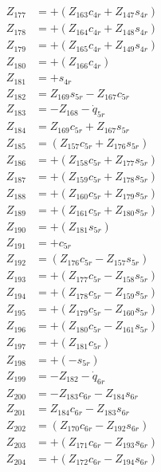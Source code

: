 \begin{multicols}{2}
\begin{align}
Z_{177} &= + (Z_{163}c_{4r} + Z_{147}s_{4r}) \nonumber \\
Z_{178} &= + (Z_{164}c_{4r} + Z_{148}s_{4r}) \nonumber \\
Z_{179} &= + (Z_{165}c_{4r} + Z_{149}s_{4r}) \nonumber \\
Z_{180} &= + (Z_{166}c_{4r}) \nonumber \\ 
Z_{181} &= + s_{4r} \nonumber \\
Z_{182} &=  Z_{169}s_{5r} - Z_{167}c_{5r} \nonumber \\
Z_{183} &=                 - Z_{168} - \dot{q}_{5r} \nonumber \\
Z_{184} &= Z_{169}c_{5r} + Z_{167}s_{5r} \nonumber \\
Z_{185} &= (Z_{157}c_{5r} + Z_{176}s_{5r}) \nonumber \\
Z_{186} &= + (Z_{158}c_{5r} + Z_{177}s_{5r}) \nonumber \\
Z_{187} &= + (Z_{159}c_{5r} + Z_{178}s_{5r}) \nonumber \\
Z_{188} &= + (Z_{160}c_{5r} + Z_{179}s_{5r}) \nonumber \\
Z_{189} &= + (Z_{161}c_{5r} + Z_{180}s_{5r}) \nonumber \\
Z_{190} &= + (Z_{181}s_{5r}) \nonumber \\
Z_{191} &= + c_{5r} \nonumber \\
Z_{192} &= (Z_{176}c_{5r} - Z_{157}s_{5r}) \nonumber \\
Z_{193} &= + (Z_{177}c_{5r} - Z_{158}s_{5r}) \nonumber \\
Z_{194} &= + (Z_{178}c_{5r} - Z_{159}s_{5r}) \nonumber \\
Z_{195} &= + (Z_{179}c_{5r} - Z_{160}s_{5r}) \nonumber \\
Z_{196} &= + (Z_{180}c_{5r} - Z_{161}s_{5r}) \nonumber \\
Z_{197} &= + (Z_{181}c_{5r}) \nonumber \\
Z_{198} &= + (-s_{5r}) \nonumber \\
Z_{199} &=                   - Z_{182} - \dot{q}_{6r} \nonumber \\
Z_{200} &= - Z_{183}c_{6r} - Z_{184}s_{6r} \nonumber \\
Z_{201} &=   Z_{184}c_{6r} - Z_{183}s_{6r} \nonumber \\
Z_{202} &= (Z_{170}c_{6r} - Z_{192}s_{6r}) \nonumber \\
Z_{203} &= + (Z_{171}c_{6r} - Z_{193}s_{6r}) \nonumber \\
Z_{204} &= + (Z_{172}c_{6r} - Z_{194}s_{6r}) \nonumber \\

\end{align}
\end{multicols}
